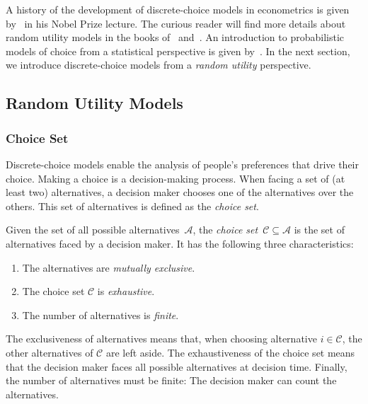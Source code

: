 A history of the development of discrete-choice models in econometrics is given by~\citet{mcfadden2001economic} in his Nobel Prize lecture.
The curious reader will find more details about random utility models in the books of~\citet[Chapter~1]{train2009discrete} and~\citet[Chapter~3]{hensher2005applied}.
An introduction to probabilistic models of choice from a statistical perspective is given by~\citet[Chapter~1]{maystre2018efficient}.
In the next section, we introduce discrete-choice models from a \emph{random utility} perspective.

\subsection{Random Utility Models}

\subsubsection{Choice Set}
Discrete-choice models enable the analysis of people's preferences that drive their choice.
Making a choice is a decision-making process.
When facing a set of (at least two) alternatives, a decision maker chooses one of the alternatives over the others.
This set of alternatives is defined as the \emph{choice set}.

\begin{definition}
	Given the set of all possible alternatives~$\mathcal{A}$, the \emph{choice set}~$\mathcal{C} \subseteq \mathcal{A}$ is the set of alternatives faced by a decision maker.
	It has the following three characteristics:
	\begin{enumerate}
		\item The alternatives are \emph{mutually exclusive}.
		\item The choice set $\mathcal{C}$ is \emph{exhaustive}.
		\item The number of alternatives is \emph{finite}.
	\end{enumerate}
\end{definition}

The exclusiveness of alternatives means that, when choosing alternative $i \in \mathcal{C}$, the other alternatives of $\mathcal{C}$ are left aside.
The exhaustiveness of the choice set means that the decision maker faces all possible alternatives at decision time.
Finally, the number of alternatives must be finite:
The decision maker can count the alternatives.

